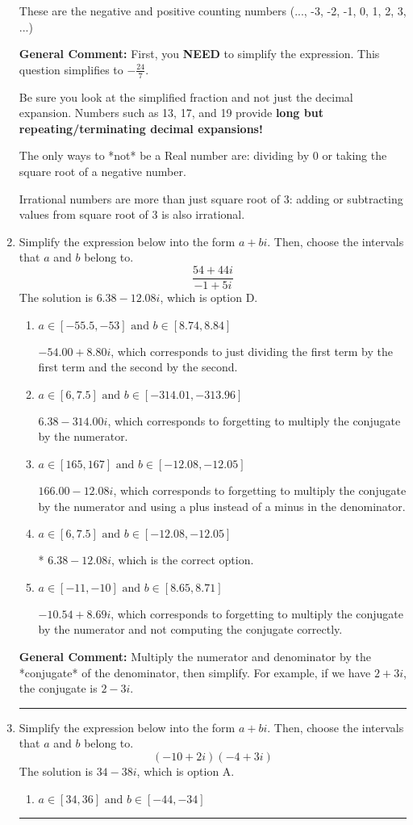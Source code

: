 \documentclass{extbook}[14pt]
\newcommand{\litem}[1]{\item #1

\rule{\textwidth}{0.4pt}}
\begin{document}
\begin{enumerate}
{\begin{enumerate}[label=\Alph*.]
These are the negative and positive counting numbers (..., -3, -2, -1, 0, 1, 2, 3, ...)
\end{enumerate}

\textbf{General Comment:} First, you \textbf{NEED} to simplify the expression. This question simplifies to $-\frac{24}{7}$. 
 
 Be sure you look at the simplified fraction and not just the decimal expansion. Numbers such as 13, 17, and 19 provide \textbf{long but repeating/terminating decimal expansions!} 
 
 The only ways to *not* be a Real number are: dividing by 0 or taking the square root of a negative number. 
 
 Irrational numbers are more than just square root of 3: adding or subtracting values from square root of 3 is also irrational.
}
\litem{
Simplify the expression below into the form $a+bi$. Then, choose the intervals that $a$ and $b$ belong to.
\[ \frac{54 + 44 i}{-1 + 5 i} \]The solution is \( 6.38  - 12.08 i \), which is option D.\begin{enumerate}[label=\Alph*.]
\item \( a \in [-55.5, -53] \text{ and } b \in [8.74, 8.84] \)

 $-54.00  + 8.80 i$, which corresponds to just dividing the first term by the first term and the second by the second.
\item \( a \in [6, 7.5] \text{ and } b \in [-314.01, -313.96] \)

 $6.38  - 314.00 i$, which corresponds to forgetting to multiply the conjugate by the numerator.
\item \( a \in [165, 167] \text{ and } b \in [-12.08, -12.05] \)

 $166.00  - 12.08 i$, which corresponds to forgetting to multiply the conjugate by the numerator and using a plus instead of a minus in the denominator.
\item \( a \in [6, 7.5] \text{ and } b \in [-12.08, -12.05] \)

* $6.38  - 12.08 i$, which is the correct option.
\item \( a \in [-11, -10] \text{ and } b \in [8.65, 8.71] \)

 $-10.54  + 8.69 i$, which corresponds to forgetting to multiply the conjugate by the numerator and not computing the conjugate correctly.
\end{enumerate}

\textbf{General Comment:} Multiply the numerator and denominator by the *conjugate* of the denominator, then simplify. For example, if we have $2+3i$, the conjugate is $2-3i$.
}
\litem{
Simplify the expression below into the form $a+bi$. Then, choose the intervals that $a$ and $b$ belong to.
\[ (-10 + 2 i)(-4 + 3 i) \]The solution is \( 34 - 38 i \), which is option A.\begin{enumerate}[label=\Alph*.]
\item \( a \in [34, 36] \text{ and } b \in [-44, -34] \)


\end{enumerate}}
\end{enumerate}
\end{document}
